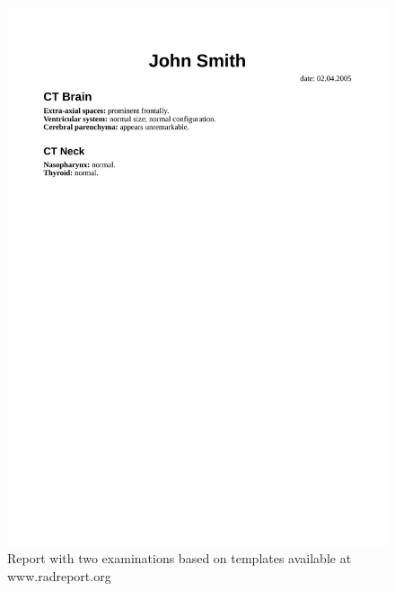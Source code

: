 \documentclass[12pt, twoside, openany]{report}
\theoremstyle{definition}
\begin{document}
\begin{figure}
	\centering
	\includegraphics[width=\linewidth, trim={0 20cm 0cm 2.5cm},clip]{rendered-report-eng}
	\caption{Report with two examinations based on templates available at www.radreport.org	\label{fig:rendered-report-eng}}
	
\end{figure}
\end{document}
